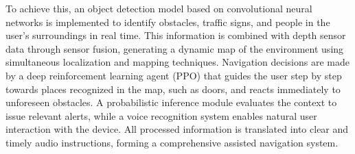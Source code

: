     To achieve this, an object detection model based on convolutional neural networks is implemented to identify obstacles, traffic signs, and people in the user’s surroundings in real time. This information is combined with depth sensor data through sensor fusion, generating a dynamic map of the environment using simultaneous localization and mapping techniques. Navigation decisions are made by a deep reinforcement learning agent (PPO) that guides the user step by step towards places recognized in the map, such as doors, and reacts immediately to unforeseen obstacles. A probabilistic inference module evaluates the context to issue relevant alerts, while a voice recognition system enables natural user interaction with the device. All processed information is translated into clear and timely audio instructions, forming a comprehensive assisted navigation system.


